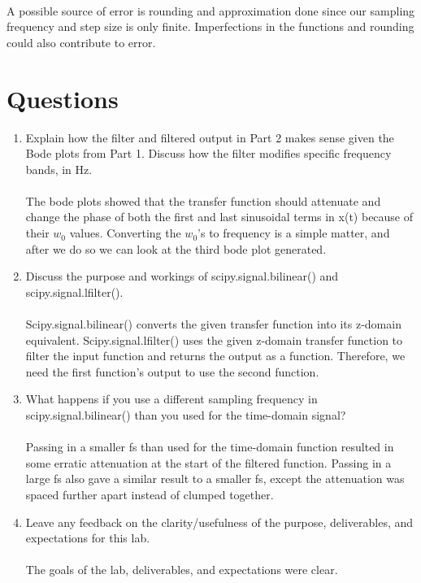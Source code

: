 \documentclass[12pt]{report}
\begin{document}
\paragraph{} A possible source of error is rounding and approximation done since our sampling frequency and step size is only finite. Imperfections in the functions and rounding could also contribute to error. 

\section{Questions} %
    \begin{enumerate}
        \item Explain how the filter and filtered output in Part 2 makes sense given the Bode plots from
Part 1. Discuss how the filter modifies specific frequency bands, in Hz.
        \paragraph{} The bode plots showed that the transfer function should attenuate and change the phase of both the first and last sinusoidal terms in x(t) because of their $w_0$ values. Converting the $w_0$'s to frequency is a simple matter, and after we do so we can look at the third bode plot generated. 
        
        \item Discuss the purpose and workings of
scipy.signal.bilinear() and scipy.signal.lfilter().

        \paragraph{} Scipy.signal.bilinear() converts the given transfer function into its z-domain equivalent. Scipy.signal.lfilter() uses the given z-domain transfer function to filter the input function and returns the output as a function. Therefore, we need the first function's output to use the second function.
        
        \item What happens if you use a different sampling frequency in scipy.signal.bilinear() than
you used for the time-domain signal?
        \paragraph{} Passing in a smaller fs than used for the time-domain function resulted in some erratic attenuation at the start of the filtered function. Passing in a large fs also gave a similar result to a smaller fs, except the attenuation was spaced further apart instead of clumped together. 
                
        \item Leave any feedback on the clarity/usefulness of the purpose, deliverables, and expectations for this lab.
        \paragraph{} The goals of the lab, deliverables, and expectations were clear. 
    \end{enumerate}
\end{document}
